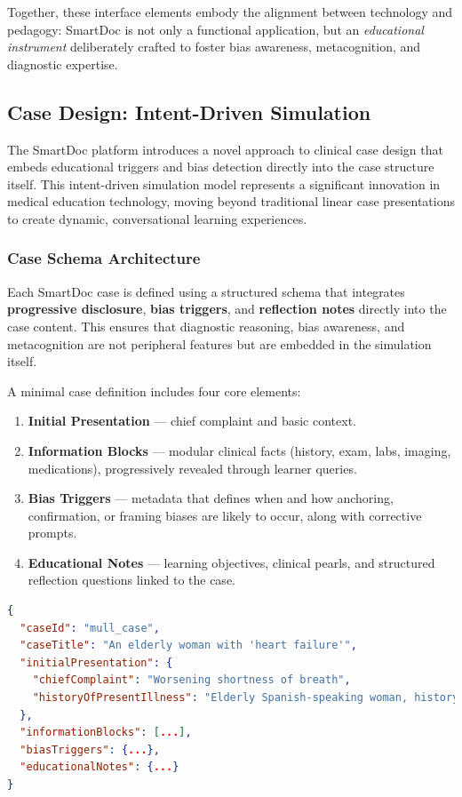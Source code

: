 \medskip
Together, these interface elements embody the alignment between technology and
pedagogy: SmartDoc is not only a functional application, but an
\emph{educational instrument} deliberately crafted to foster bias awareness,
metacognition, and diagnostic expertise.

\subsection{Case Design: Intent-Driven Simulation}
\label{sec:case_design_intent_driven}

The SmartDoc platform introduces a novel approach to clinical case design that embeds
educational triggers and bias detection directly into the case structure itself. This
intent-driven simulation model represents a significant innovation in medical education
technology, moving beyond traditional linear case presentations to create dynamic,
conversational learning experiences.

\subsubsection{Case Schema Architecture}

Each SmartDoc case is defined using a structured schema that integrates
\textbf{progressive disclosure}, \textbf{bias triggers}, and \textbf{reflection notes}
directly into the case content. This ensures that diagnostic reasoning, bias
awareness, and metacognition are not peripheral features but are embedded in the
simulation itself.

A minimal case definition includes four core elements:

\begin{enumerate}
    \item \textbf{Initial Presentation} — chief complaint and basic context.
    \item \textbf{Information Blocks} — modular clinical facts (history, exam,
    labs, imaging, medications), progressively revealed through learner queries.
    \item \textbf{Bias Triggers} — metadata that defines when and how anchoring,
    confirmation, or framing biases are likely to occur, along with corrective prompts.
    \item \textbf{Educational Notes} — learning objectives, clinical pearls, and
    structured reflection questions linked to the case.
\end{enumerate}

\begin{lstlisting}[language=json]
{
  "caseId": "mull_case",
  "caseTitle": "An elderly woman with 'heart failure'",
  "initialPresentation": {
    "chiefComplaint": "Worsening shortness of breath",
    "historyOfPresentIllness": "Elderly Spanish-speaking woman, history provided by son..."
  },
  "informationBlocks": [...],
  "biasTriggers": {...},
  "educationalNotes": {...}
}
\end{lstlisting}

